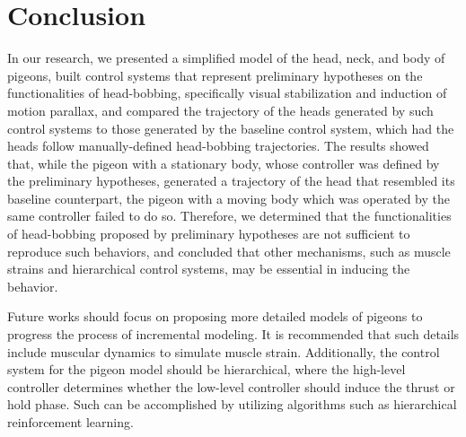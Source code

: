 \chapter{Conclusion} \label{ch:conclusion}
In our research, we presented a simplified model of the head, neck, and body of pigeons, built control systems that represent preliminary hypotheses on the functionalities of head-bobbing, specifically visual stabilization and induction of motion parallax, and compared the trajectory of the heads generated by such control systems to those generated by the baseline control system, which had the heads follow manually-defined head-bobbing trajectories.
The results showed that, while the pigeon with a stationary body, whose controller was defined by the preliminary hypotheses, generated a trajectory of the head that resembled its baseline counterpart, the pigeon with a moving body which was operated by the same controller failed to do so.
Therefore, we determined that the functionalities of head-bobbing proposed by preliminary hypotheses are not sufficient to reproduce such behaviors, and concluded that other mechanisms, such as muscle strains and hierarchical control systems, may be essential in inducing the behavior.

Future works should focus on proposing more detailed models of pigeons to progress the process of incremental modeling.
It is recommended that such details include muscular dynamics to simulate muscle strain.
Additionally, the control system for the pigeon model should be hierarchical, where the high-level controller determines whether the low-level controller should induce the thrust or hold phase.
Such can be accomplished by utilizing algorithms such as hierarchical reinforcement learning.
